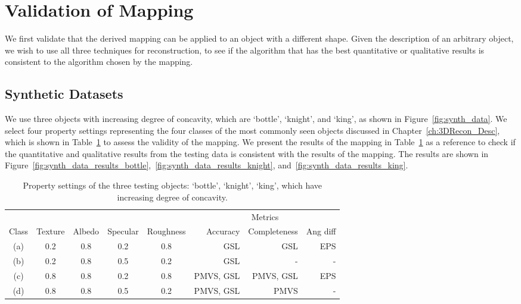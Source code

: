 \section{Validation of Mapping}
\label{sec:interp_extend}
We first validate that the derived mapping can be applied to an object with a different shape. Given the description of an arbitrary object, we wish to use all three techniques for reconstruction, to see if the algorithm that has the best quantitative or qualitative results is consistent to the algorithm chosen by the mapping.

\subsection{Synthetic Datasets}
We use three objects with increasing degree of concavity, which are `bottle', `knight', and `king', as shown in Figure~\ref{fig:synth_data}. We select four property settings representing the four classes of the most commonly seen objects discussed in Chapter~\ref{ch:3DRecon_Desc}, which is shown in Table~\ref{tab:prop_list_synth_data} to assess the validity of the mapping. We present the results of the mapping in Table~\ref{tab:prop_list_synth_data} as a reference to check if the quantitative and qualitative results from the testing data is consistent with the results of the mapping. The results are shown in Figure~\ref{fig:synth_data_results_bottle},~\ref{fig:synth_data_results_knight}, and~\ref{fig:synth_data_results_king}.
\begin{table}[!htbp]
  \centering
  \begin{tabular}{*{5}{c}|*{3}{r}}
  \hline
  & & & & & \multicolumn{3}{c}{Metrics}\\
  Class & Texture & Albedo & Specular & Roughness & Accuracy & Completeness & Ang diff\\
  \hline
  (a) & 0.2 & 0.8 & 0.2 & 0.8 & GSL & GSL & EPS\\
  (b) & 0.2 & 0.8 & 0.5 & 0.2 & GSL & - & - \\
  (c) & 0.8 & 0.8 & 0.2 & 0.8 & PMVS, GSL & PMVS, GSL & EPS \\
  (d) & 0.8 & 0.8 & 0.5 & 0.2 & PMVS, GSL & PMVS & -\\
  \hline
  \end{tabular}
  \caption{Property settings of the three testing objects: `bottle', `knight', `king', which have increasing degree of concavity.}
  \label{tab:prop_list_synth_data}
\end{table}

